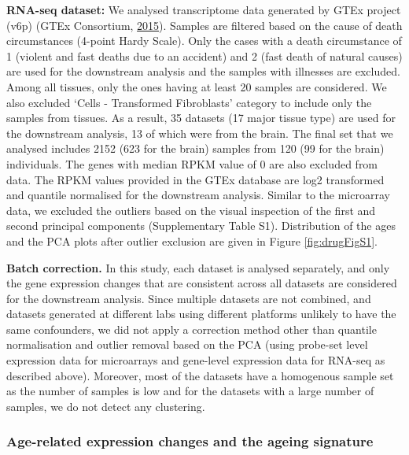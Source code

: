 \documentclass[12pt,twoside]{unicam}
\begin{document}
\textbf{RNA-seq dataset:} We analysed transcriptome data generated by GTEx project (v6p) (GTEx Consortium, \protect\hyperlink{ref-GTEx_Consortium2015}{2015}). Samples are filtered based on the cause of death circumstances (4-point Hardy Scale). Only the cases with a death circumstance of 1 (violent and fast deaths due to an accident) and 2 (fast death of natural causes) are used for the downstream analysis and the samples with illnesses are excluded. Among all tissues, only the ones having at least 20 samples are considered. We also excluded `Cells - Transformed Fibroblasts' category to include only the samples from tissues. As a result, 35 datasets (17 major tissue type) are used for the downstream analysis, 13 of which were from the brain. The final set that we analysed includes 2152 (623 for the brain) samples from 120 (99 for the brain) individuals. The genes with median RPKM value of 0 are also excluded from data. The RPKM values provided in the GTEx database are log2 transformed and quantile normalised for the downstream analysis. Similar to the microarray data, we excluded the outliers based on the visual inspection of the first and second principal components (Supplementary Table S1). Distribution of the ages and the PCA plots after outlier exclusion are given in Figure \ref{fig:drugFigS1}.

\textbf{Batch correction.} In this study, each dataset is analysed separately, and only the gene expression changes that are consistent across all datasets are considered for the downstream analysis. Since multiple datasets are not combined, and datasets generated at different labs using different platforms unlikely to have the same confounders, we did not apply a correction method other than quantile normalisation and outlier removal based on the PCA (using probe-set level expression data for microarrays and gene-level expression data for RNA-seq as described above). Moreover, most of the datasets have a homogenous sample set as the number of samples is low and for the datasets with a large number of samples, we do not detect any clustering.

\hypertarget{ageingSignatureMethods}{%
\subsubsection{Age-related expression changes and the ageing signature}\label{ageingSignatureMethods}}
\end{document}
